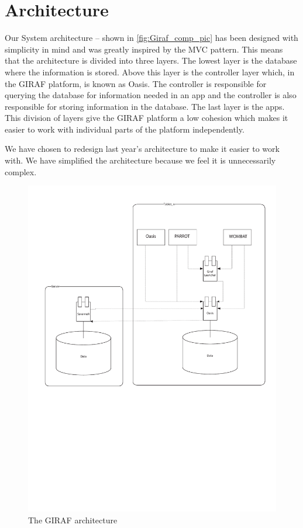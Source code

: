 \section{Architecture}
Our System architecture -- shown in \autoref{fig:Giraf_comp_pic} has been designed with simplicity in mind and was greatly inspired by the MVC pattern. This means that the architecture is divided into three layers. The lowest layer is the database where the information is stored. Above this layer is the controller layer which, in the GIRAF platform, is known as Oasis. The controller is responsible for querying the database for information needed in an app and the controller is also responsible for storing information in the database. The last layer is the apps. This division of layers give the GIRAF platform a low cohesion which makes it easier to work with individual parts of the platform independently.

We have chosen to redesign last year's architecture \cite{LastYearsArchitecture} to make it easier to work with. We have simplified the architecture because we feel it is unnecessarily complex.

\begin{figure}
	\centering
		\includegraphics[width=\textwidth]{images/Giraf_comp.pdf}
	\caption{The GIRAF architecture}
	\label{fig:Giraf_comp_pic}
\end{figure}
